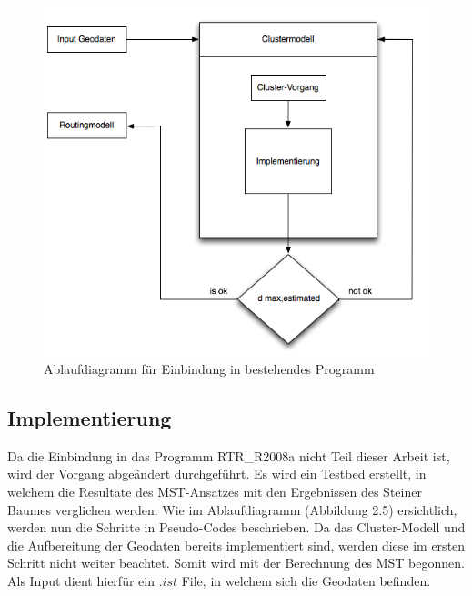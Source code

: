 \begin{figure}[H]
    \centerline{\includegraphics[scale=0.5]{pics/diagramm_1}}
    \caption[Ablaufdiagramm für Einbindung in bestehendes Programm]{\label{FiG:Ablaufdiagramm für Einbindung in bestehendes Programm }
	Ablaufdiagramm für Einbindung in bestehendes Programm}
\end{figure}

\vspace{0.5cm}

\subsection{Implementierung}
\label{sec:2methoden}

\vspace{0.5cm}

Da die Einbindung in das Programm RTR\_R2008a nicht Teil dieser Arbeit ist, wird der Vorgang abgeändert durchgeführt. 
Es wird ein Testbed erstellt, in welchem die Resultate des MST-Ansatzes mit den Ergebnissen des Steiner Baumes verglichen werden.
Wie im Ablaufdiagramm (Abbildung 2.5) ersichtlich, werden nun die Schritte in Pseudo-Codes beschrieben. Da das Cluster-Modell und die Aufbereitung der
Geodaten bereits implementiert sind, werden diese im ersten Schritt nicht weiter beachtet. Somit wird mit der Berechnung des MST begonnen. Als Input 
dient hierfür ein $.ist$ File, in welchem sich die Geodaten befinden. 

